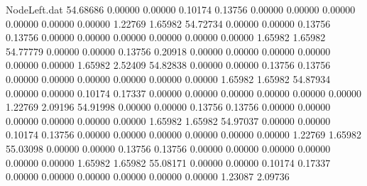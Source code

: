 \begin{filecontents}{NodeLeft.dat}
  54.68686    0.00000    0.00000     0.10174    0.13756    0.00000    0.00000    0.00000    0.00000    0.00000    0.00000    1.22769    1.65982
  54.72734    0.00000    0.00000     0.13756    0.13756    0.00000    0.00000    0.00000    0.00000    0.00000    0.00000    1.65982    1.65982
  54.77779    0.00000    0.00000     0.13756    0.20918    0.00000    0.00000    0.00000    0.00000    0.00000    0.00000    1.65982    2.52409
  54.82838    0.00000    0.00000     0.13756    0.13756    0.00000    0.00000    0.00000    0.00000    0.00000    0.00000    1.65982    1.65982
  54.87934    0.00000    0.00000     0.10174    0.17337    0.00000    0.00000    0.00000    0.00000    0.00000    0.00000    1.22769    2.09196
  54.91998    0.00000    0.00000     0.13756    0.13756    0.00000    0.00000    0.00000    0.00000    0.00000    0.00000    1.65982    1.65982
  54.97037    0.00000    0.00000     0.10174    0.13756    0.00000    0.00000    0.00000    0.00000    0.00000    0.00000    1.22769    1.65982
  55.03098    0.00000    0.00000     0.13756    0.13756    0.00000    0.00000    0.00000    0.00000    0.00000    0.00000    1.65982    1.65982
  55.08171    0.00000    0.00000     0.10174    0.17337    0.00000    0.00000    0.00000    0.00000    0.00000    0.00000    1.23087    2.09736
\end{filecontents}
